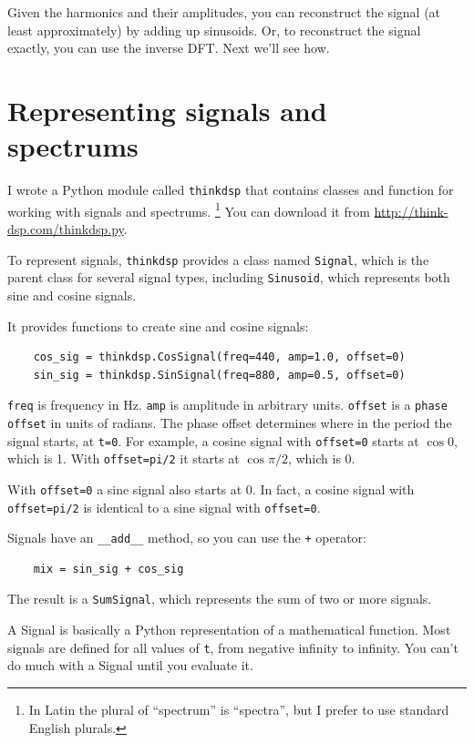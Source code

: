 \documentclass[12pt]{book}
\begin{document}
Given the harmonics and their amplitudes, you can reconstruct the
signal (at least approximately) by adding up sinusoids.  Or, to
reconstruct the signal exactly, you can use the inverse DFT.  
Next we'll see how.


\section{Representing signals and spectrums}

I wrote a Python module called {\tt thinkdsp} that contains
classes and function for working with signals and spectrums.
\footnote{In Latin the plural of ``spectrum'' is ``spectra'', but I
prefer to use standard English plurals.}  You can download
it from \url{http://think-dsp.com/thinkdsp.py}.

To represent signals, {\tt thinkdsp} provides a class named
{\tt Signal}, which is the parent class for several signal types,
including {\tt Sinusoid}, which represents both sine and cosine
signals.

It provides functions to create sine and cosine signals:

\begin{verbatim}
    cos_sig = thinkdsp.CosSignal(freq=440, amp=1.0, offset=0)
    sin_sig = thinkdsp.SinSignal(freq=880, amp=0.5, offset=0)
\end{verbatim}

{\tt freq} is frequency in Hz.  {\tt amp} is amplitude in arbitrary
units.  {\tt offset} is a {\tt phase offset} in units of radians.
The phase offset determines where in the period the signal starts,
at {\tt t=0}.  For example, a cosine signal with {\tt offset=0}
starts at $\cos 0$, which is 1.  With {\tt offset=pi/2} it
starts at $\cos \pi/2$, which is 0.

With {\tt offset=0} a sine signal also starts at 0.  In fact,
a cosine signal with {\tt offset=pi/2} is identical to a sine
signal with {\tt offset=0}.

Signals have an \verb"__add__" method, so you can use the {\tt +}
operator:

\begin{verbatim}
    mix = sin_sig + cos_sig
\end{verbatim}

The result is a {\tt SumSignal}, which represents the sum of two
or more signals.

A Signal is basically a Python representation of a mathematical
function.  Most signals are defined for all values of {\tt t},
from negative infinity to infinity.  You can't do much with a
Signal until you evaluate it.
\end{document}

